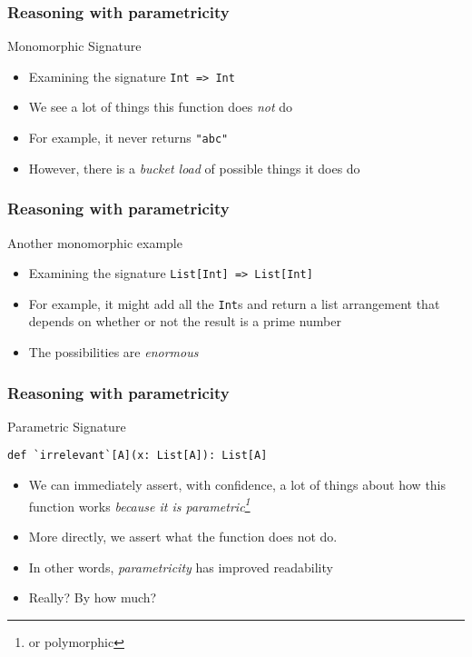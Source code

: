 \begin{frame}[fragile]
\frametitle{Reasoning with parametricity}
\begin{block}{Monomorphic Signature}
\begin{itemize}
  \item Examining the signature \lstinline[style=scala]{Int => Int}
  \item We see a lot of things this function does \emph{not} do
  \item For example, it never returns \lstinline[style=scala]{"abc"}
  \item However, there is a \emph{bucket load} of possible things it does do
\end{itemize}
\end{block}
\end{frame}

\begin{frame}[fragile]
\frametitle{Reasoning with parametricity}
\begin{block}{Another monomorphic example}
\begin{itemize}
  \item Examining the signature \lstinline[style=scala]{List[Int] => List[Int]}
  \item For example, it might add all the \lstinline{Int}s and return a list arrangement that depends on whether or not the result is a prime number
  \item The possibilities are \emph{enormous}
\end{itemize}
\end{block}
\end{frame}

\begin{frame}[fragile]
\frametitle{Reasoning with parametricity}
\begin{block}{Parametric Signature}
\begin{lstlisting}[style=scala]
def `irrelevant`[A](x: List[A]): List[A]
\end{lstlisting}
\begin{itemize}
  \item We can immediately assert, with confidence, a lot of things about how this function works \emph{because it is parametric\footnote{or polymorphic}}
  \item More directly, we assert what the function does not do.
  \item<2> In other words, \emph{parametricity} has improved readability
  \item<2> Really? By how much?
\end{itemize}
\end{block}
\end{frame}

